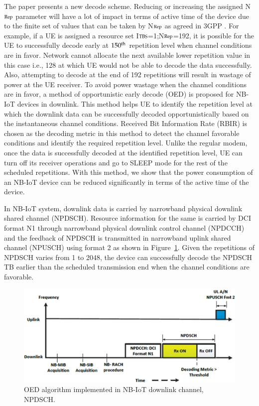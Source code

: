 \begin{multicols}{2}
The paper \cite{art1-key28} presents a new decode scheme. Reducing or increasing the assigned N$\scriptsize{\text{Rep}}$ parameter will have a lot of impact in terms of active time of the device due to the finite set of values that can be taken by N$\scriptsize{\text{Rep}}$ as agreed in 3GPP \cite{art1-key27}. For example, if a UE is assigned a resource set I$\scriptsize{\text{TBS}}$=1;N$\scriptsize{\text{Rep}}$=192, it is possible for the UE to successfully decode early at $150^{\scriptsize{\text{th}}}$ repetition level when channel conditions are in favor. Network cannot allocate the next available lower repetition value in this case i.e., 128 at which UE would not be able to decode the data successfully. Also, attempting to decode at the end of 192 repetitions will result in wastage of power at the UE receiver. To avoid power wastage when the channel conditions are in favor, a method of opportunistic early decode (OED) is proposed for NB-IoT devices in downlink. This method helps UE to identify the repetition level at which the downlink data can be successfully decoded opportunistically based on the instantaneous channel conditions. Received Bit Information Rate (RBIR) is chosen as the decoding metric in this method to detect the channel favorable conditions and identify the required repetition level. Unlike the regular modem, once the data is successfully decoded at the identified repetition level, UE can turn off its receiver operations and go to SLEEP mode for the rest of the scheduled repetitions. With this method, we show that the power consumption of an NB-IoT device can be reduced significantly in terms of the active time of the device. 

In NB-IoT system, downlink data is carried by narrowband physical downlink shared channel (NPDSCH). Resource information for the same is carried by DCI format N1 through narrowband physical downlink control channel (NPDCCH) and the feedback of NPDSCH is transmitted in narrowband uplink shared channel (NPUSCH) using format 2 as shown in Figure~\ref{chap1-fig08}. Given the repetitions of NPDSCH varies from 1 to 2048, the device can successfully decode the NPDSCH TB earlier than the scheduled transmission end when the channel conditions are favorable.

\begin{figure}[H]
\centering
\includegraphics[scale=.9]{src/Figures/chap1/chap1-fig08.jpg}
\caption{OED algorithm implemented in NB-IoT downlink channel, NPDSCH.}\label{chap1-fig08}
\vspace {-.5cm}
\end{figure}


\end{multicols}
